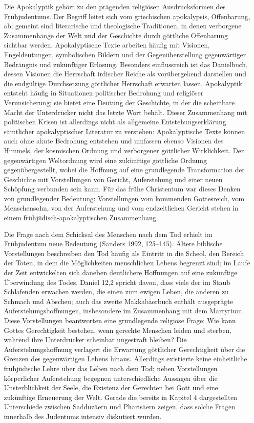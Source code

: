 \documentclass[fontsize=12pt]{mybib}
\begin{document}
Die Apokalyptik gehört zu den prägenden religiösen Ausdrucksformen des Frühjudentums. Der Begriff leitet sich vom griechischen apokalypsis, Offenbarung, ab; gemeint sind literarische und theologische Traditionen, in denen verborgene Zusammenhänge der Welt und der Geschichte durch göttliche Offenbarung sichtbar werden. Apokalyptische Texte arbeiten häufig mit Visionen, Engeldeutungen, symbolischen Bildern und der Gegenüberstellung gegenwärtiger Bedrängnis und zukünftiger Erlösung. Besonders einflussreich ist das Danielbuch, dessen Visionen die Herrschaft irdischer Reiche als vorübergehend darstellen und die endgültige Durchsetzung göttlicher Herrschaft erwarten lassen. Apokalyptik entsteht häufig in Situationen politischer Bedrohung und religiöser Verunsicherung; sie bietet eine Deutung der Geschichte, in der die scheinbare Macht der Unterdrücker nicht das letzte Wort behält. Dieser Zusammenhang mit politischen Krisen ist allerdings nicht als allgemeine Entstehungserklärung sämtlicher apokalyptischer Literatur zu verstehen: Apokalyptische Texte können auch ohne akute Bedrohung entstehen und umfassen ebenso Visionen des Himmels, der kosmischen Ordnung und verborgener göttlicher Wirklichkeit. Der gegenwärtigen Weltordnung wird eine zukünftige göttliche Ordnung gegenübergestellt, wobei die Hoffnung auf eine grundlegende Transformation der Geschichte mit Vorstellungen von Gericht, Auferstehung und einer neuen Schöpfung verbunden sein kann. Für das frühe Christentum war dieses Denken von grundlegender Bedeutung: Vorstellungen vom kommenden Gottesreich, vom Menschensohn, von der Auferstehung und vom endzeitlichen Gericht stehen in einem frühjüdisch-apokalyptischen Zusammenhang.

Die Frage nach dem Schicksal des Menschen nach dem Tod erhielt im Frühjudentum neue Bedeutung (Sanders 1992, 125–145). Ältere biblische Vorstellungen beschreiben den Tod häufig als Eintritt in die Scheol, den Bereich der Toten, in dem die Möglichkeiten menschlichen Lebens begrenzt sind; im Laufe der Zeit entwickelten sich daneben deutlichere Hoffnungen auf eine zukünftige Überwindung des Todes. Daniel 12,2 spricht davon, dass viele der im Staub Schlafenden erwachen werden, die einen zum ewigen Leben, die anderen zu Schmach und Abscheu; auch das zweite Makkabäerbuch enthält ausgeprägte Auferstehungshoffnungen, insbesondere im Zusammenhang mit dem Martyrium. Diese Vorstellungen beantworten eine grundlegende religiöse Frage: Wie kann Gottes Gerechtigkeit bestehen, wenn gerechte Menschen leiden und sterben, während ihre Unterdrücker scheinbar ungestraft bleiben? Die Auferstehungshoffnung verlagert die Erwartung göttlicher Gerechtigkeit über die Grenzen des gegenwärtigen Lebens hinaus. Allerdings existierte keine einheitliche frühjüdische Lehre über das Leben nach dem Tod; neben Vorstellungen körperlicher Auferstehung begegnen unterschiedliche Aussagen über die Unsterblichkeit der Seele, die Existenz der Gerechten bei Gott und eine zukünftige Erneuerung der Welt. Gerade die bereits in Kapitel 4 dargestellten Unterschiede zwischen Sadduzäern und Pharisäern zeigen, dass solche Fragen innerhalb des Judentums intensiv diskutiert wurden.
\end{document}

